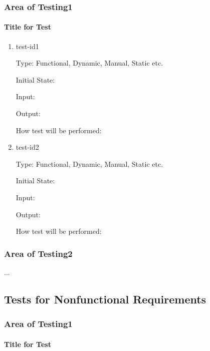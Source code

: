 \documentclass[12pt, titlepage]{article}
\begin{document}
\subsubsection{Area of Testing1}
        
\paragraph{Title for Test}

\begin{enumerate}

\item{test-id1\\}

Type: Functional, Dynamic, Manual, Static etc.
                    
Initial State: 
                    
Input: 
                    
Output: 
                    
How test will be performed: 
                    
\item{test-id2\\}

Type: Functional, Dynamic, Manual, Static etc.
                    
Initial State: 
                    
Input: 
                    
Output: 
                    
How test will be performed: 

\end{enumerate}

\subsubsection{Area of Testing2}

...

\subsection{Tests for Nonfunctional Requirements}

\subsubsection{Area of Testing1}
        
\paragraph{Title for Test}
\end{document}
